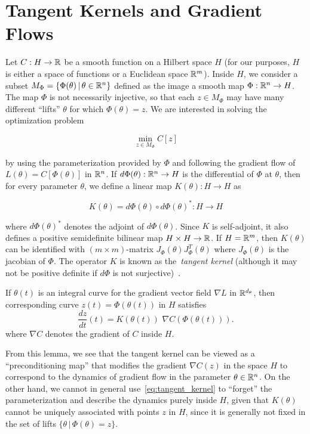 
\section{Tangent Kernels and Gradient Flows}
Let $C: H \rightarrow \mathbb{R}$ be a smooth function on a Hilbert space $H$ (for
our purposes, $H$ is either a space of functions or a Euclidean space
$\mathbb{R}^m$). Inside $H$, we consider a subset $M_\Phi = \{\Phi (\theta) \, | \,
\theta \in \mathbb{R}^{n}\}$ defined as the image a smooth map $\Phi: \mathbb{R}^ {n} \rightarrow
H$. The map $\Phi$ is not necessarily injective, so that each $z \in M_\Phi$ may
have many different ``lifts'' $\theta$ for which $\Phi(\theta) = z$. We
are interested in solving the optimization problem

\begin{equation}
\min_{z \in M_\Phi} C[z]
\end{equation}

by using the parameterization provided by $\Phi$ and following the gradient
flow of $L(\theta) = C[\Phi(\theta)]$ in $\mathbb{R}^n$. If $d \Phi(\theta):
\mathbb{R}^{n} \rightarrow H$ is the differential of $\Phi$ at $\theta$, then for
every parameter $\theta$, we define a linear map $K(\theta): H
\rightarrow H$ as

\[
K(\theta) = d \Phi(\theta) \circ d \Phi(\theta)^*: H \rightarrow
H
\]

where $d \Phi(\theta)^*$ denotes the adjoint of $d \Phi(\theta)$. Since $K$ is self-adjoint, it also defines a positive semidefinite bilinear map $H
\times H \rightarrow \mathbb{R}$. If $H = \mathbb{R}^m$, then $K(\theta)$ can be identified
with $(m \times m)$-matrix $J_\Phi(\theta) J_\Phi^T(\theta)$ where $J_\Phi(\theta)$ is
the jacobian of $\Phi$. The operator $K$ is known as the~\emph{tangent kernel}
(although it may not be positive definite if $d\Phi$ is not surjective)~\cite{NTKJacot,chizat2018note}.

\begin{lemma} If $\theta(t)$ is an integral curve for the gradient vector
field $\nabla L$ in $\mathbb{R}^{d_\theta}$, then corresponding curve $z(t) =
\Phi(\theta(t))$ in $H$ satisfies
\begin{equation}\label{eq:tangent_kernel}
\frac{d z}{dt}(t) = K(\theta(t)) \,\, \nabla C (\Phi(\theta(t))).
\end{equation}
where $\nabla C$ denotes the gradient of $C$ inside $H$.
\end{lemma}


From this lemma, we see that the tangent kernel can be viewed as a
``preconditioning map'' that modifies the gradient $\nabla C(z)$ in the space $H$ to correspond to the dynamics of gradient flow in the
parameter $\theta \in \mathbb{R}^n$. On the other hand, we cannot in general
use~\eqref{eq:tangent_kernel} to ``forget'' the parameterization and describe
the dynamics purely inside $H$, given that $K(\theta)$ cannot be uniquely
associated with points $z$ in $H$, since it is generally not fixed
in the set of lifts $\{\theta \, | \, \Phi(\theta) = z\}$. 

